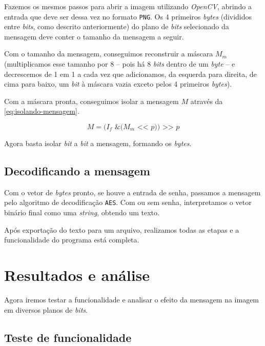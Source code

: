 \documentclass[brazilian,a4paper,twocolumn]{article}
\begin{document}
        Fazemos os mesmos passos para abrir a imagem utilizando \emph{OpenCV}, abrindo a entrada que deve ser dessa vez no formato \texttt{PNG}. Os 4 primeiros \textit{bytes} (divididos entre \textit{bits}, como descrito anteriormente) do plano de \textit{bits} selecionado da mensagem deve conter o tamanho da mensagem a seguir.

        Com o tamanho da mensagem, conseguimos reconstruir a máscara $M_m$ (multiplicamos esse tamanho por 8 -- pois há 8 \textit{bits} dentro de um \textit{byte} -- e decrescemos de 1 em 1 a cada vez que adicionamos, da esquerda para direita, de cima para baixo, um \textit{bit} à máscara vazia exceto pelos 4 primeiros \textit{bytes}).

        Com a máscara pronta, conseguimos isolar a mensagem $M$ através da \cref{eq:isolando-mensagem}.

        \begin{equation}
        \label{eq:isolando-mensagem}
            M = \texttt{($I_f$ \& ($M_m$ << $p$)) >> $p$}
        \end{equation}

        Agora basta isolar \textit{bit} a \textit{bit} a mensagem, formando os \textit{bytes}.

    \subsection{Decodificando a mensagem}

        Com o vetor de \textit{bytes} pronto, se houve a entrada de senha, passamos a mensagem pelo algoritmo de decodificação \texttt{AES}. Com ou sem senha, interpretamos o vetor binário final como uma \textit{string}, obtendo um texto.

        Após exportação do texto para um arquivo, realizamos todas as etapas e a funcionalidade do programa está completa.


\section{Resultados e análise}

    Agora iremos testar a funcionalidade e analisar o efeito da mensagem na imagem em diversos planos de \textit{bits}.

    \subsection{Teste de funcionalidade}
\end{document}
